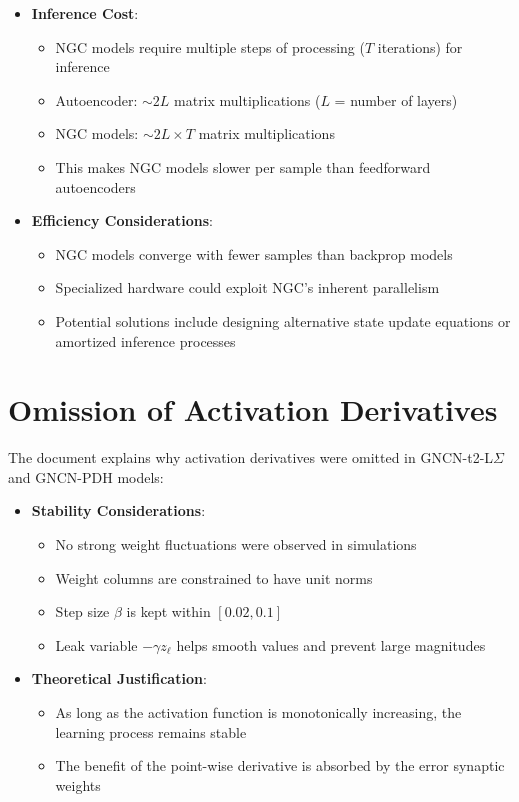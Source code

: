 \documentclass{article}
\begin{document}
\begin{itemize}
  \item \textbf{Inference Cost}:
  \begin{itemize}
    \item NGC models require multiple steps of processing ($T$ iterations) for inference
    \item Autoencoder: $\sim 2L$ matrix multiplications ($L$ = number of layers)
    \item NGC models: $\sim 2L \times T$ matrix multiplications
    \item This makes NGC models slower per sample than feedforward autoencoders
  \end{itemize}

  \item \textbf{Efficiency Considerations}:
  \begin{itemize}
    \item NGC models converge with fewer samples than backprop models
    \item Specialized hardware could exploit NGC's inherent parallelism
    \item Potential solutions include designing alternative state update equations or amortized inference processes
  \end{itemize}
\end{itemize}

\section{Omission of Activation Derivatives}

The document explains why activation derivatives were omitted in GNCN-t2-L$\Sigma$ and GNCN-PDH models:

\begin{itemize}
  \item \textbf{Stability Considerations}:
  \begin{itemize}
    \item No strong weight fluctuations were observed in simulations
    \item Weight columns are constrained to have unit norms
    \item Step size $\beta$ is kept within $[0.02, 0.1]$
    \item Leak variable $-\gamma z_\ell$ helps smooth values and prevent large magnitudes
  \end{itemize}

  \item \textbf{Theoretical Justification}:
  \begin{itemize}
    \item As long as the activation function is monotonically increasing, the learning process remains stable
    \item The benefit of the point-wise derivative is absorbed by the error synaptic weights
  \end{itemize}
\end{itemize}
\end{document}
